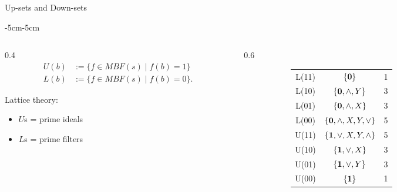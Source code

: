 \documentclass[aspectratio=169,9pt]{beamer}
\newcommand{\bzero}{{\bf 0}}
\newcommand{\bone}{{\bf 1}}
\theoremstyle{definition}
\theoremstyle{remark}
\begin{document}
\begin{frame}{Up-sets and Down-sets}
\begin{adjustwidth}{-5cm}{-5cm}
\begin{columns}
    \begin{column}{0.4\textwidth}
        \begin{align*}
            U(b) &:=\{ f\in MBF(s) \;|\; f(b) = 1\} \\
            L(b) &:=\{ f\in MBF(s) \;|\; f(b) = 0\}.
        \end{align*}
        \vspace{0.5cm}
        
        \pause[3]Lattice theory:
        \begin{itemize}
            \item $U$s = prime ideals
            \item $L$s = prime filters
        \end{itemize}
    \end{column}
    \pause[2]
    \begin{column}{0.6\textwidth}
        \begin{figure}
        \begin{subfigure}[c]{0.59\textwidth}
        \begin{tabular}{|c|c|c|}
         \hline 
         L(11)  & $\{\bzero\}$                    &1 \\
         L(10)  & $\{\bzero, \wedge, Y\}$         &3 \\
         L(01)  & $\{\bzero, \wedge, X\}$         &3 \\
         L(00)  & $\{\bzero, \wedge, X, Y,\vee\}$ &5 \\
         \hline
         \hline
         U(11) &  $\{\bone, \vee, X, Y, \wedge\}$ &5 \\
         U(10) &  $\{\bone, \vee, X \}$           &3 \\
         U(01) &  $\{\bone, \vee, Y\}$            &3 \\
         U(00) &  $\{\bone\}$                     &1 \\
         \hline
        \end{tabular}
        \end{subfigure}
        \pause[3]
        \begin{subfigure}[c]{0.39\textwidth}
\end{subfigure}
\end{figure}
\end{column}
\end{columns}
\end{adjustwidth}
\end{frame}
\end{document}
